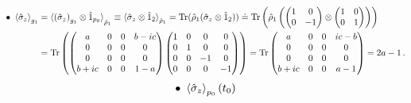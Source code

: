\documentclass[11pt]{article}
\numberwithin{equation}{section} %
\numberwithin{figure}{section} %
\begin{document}
\begin{appendices}
\vspace{1cm}
\subsection{} \label{sigma_otimes_one_appendix}

\begin{equation} \label{sigmaz_otimes_one_appendix}
\begin{split}
 \bullet\,\,\braket{\hat{\sigma}_z}_{g_1}
 &= \braket{ \left(\hat{\sigma}_z\right)_{g_1}\otimes \hat{1}_{p_0}}_{\hat{\rho}_1} \equiv\braket{\hat{\sigma}_z\otimes\hat{1}_2}_{\hat{\rho}_1}=\textrm{Tr}(\hat{\rho}_{1}(\hat{\sigma}_z\otimes\hat{1}_2))\doteq \textrm{Tr}\begin{pmatrix}\hat{\rho}_{1}\begin{pmatrix}\begin{pmatrix}1&0\\0&-1\end{pmatrix}\otimes\begin{pmatrix}1&0\\0&1\end{pmatrix}\end{pmatrix}\end{pmatrix}\\
 &=\textrm{Tr}\begin{pmatrix}\begin{pmatrix}a&0&0&b-ic\\0&0&0&0\\0&0&0&0\\b+ic&0&0&1-a\end{pmatrix}\begin{pmatrix}1&0&0&0\\0&1&0&0\\0&0&-1&0\\0&0&0&-1\end{pmatrix}\end{pmatrix}=\textrm{Tr}\begin{pmatrix}a&0&0&ic-b\\0&0&0&0\\0&0&0&0\\b+ic&0&0&a-1\end{pmatrix}=2a-1\,\textrm{.}
\end{split}
\end{equation}
\begin{equation} \label{sigmaz_otimes_one_appendix2}
\begin{split}
 \bullet\,\,\braket{\hat{\sigma}_z}_{p_0}(t_0)

\end{split}
\end{equation}
\end{appendices}
\end{document}
